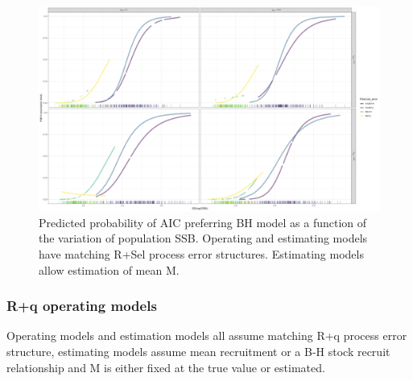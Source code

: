 \documentclass[
  12pt,
]{article}
\begin{document}
\begin{figure}
\caption{Predicted probability of AIC preferring BH model as a function of the variation of population SSB. Operating and estimating models have matching R+Sel process error structures. Estimating models allow estimation of mean M.}\label{Sel_om_ME_BH_glm_AIC_plots}
\begin{center}
\includegraphics[width = \textwidth]{Sel_om_ME_pred_BH_best.png}
\end{center}
\end{figure}

\hypertarget{rq-operating-models-2}{%
\subsubsection*{R+q operating models}\label{rq-operating-models-2}}

\begin{table}
\caption{Operating models and estimation models all assume matching R+q process error structure, estimating models assume mean recruitment or a B-H stock recruit relationship and M is either fixed at the true value or estimated.}
{}
\end{table}
\end{document}
